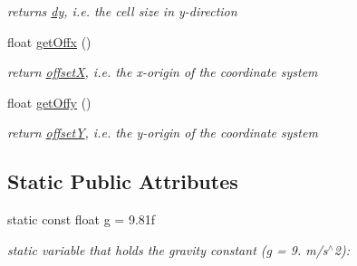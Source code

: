 \begin{DoxyCompactItemize}
\begin{DoxyCompactList}\small\item\em returns \hyperlink{classSWE__Block_a9feb988748d792bca0ca0508e43bd87f}{dy}, i.\-e. the cell size in y-\/direction \end{DoxyCompactList}\item 
\hypertarget{classSWE__Block_a5f279d69697c335d5e9c9c4d3c54e3b8}{float \hyperlink{classSWE__Block_a5f279d69697c335d5e9c9c4d3c54e3b8}{get\-Offx} ()}\label{classSWE__Block_a5f279d69697c335d5e9c9c4d3c54e3b8}

\begin{DoxyCompactList}\small\item\em return \hyperlink{classSWE__Block_aa9e9b1fa797c133c4989e4c54f09b542}{offset\-X}, i.\-e. the x-\/origin of the coordinate system \end{DoxyCompactList}\item 
\hypertarget{classSWE__Block_a22364064412b824204dc8a79bf572893}{float \hyperlink{classSWE__Block_a22364064412b824204dc8a79bf572893}{get\-Offy} ()}\label{classSWE__Block_a22364064412b824204dc8a79bf572893}

\begin{DoxyCompactList}\small\item\em return \hyperlink{classSWE__Block_aa05241101a66f0f0548eba6dbbaa1bbb}{offset\-Y}, i.\-e. the y-\/origin of the coordinate system \end{DoxyCompactList}\end{DoxyCompactItemize}
\subsection*{Static Public Attributes}
\begin{DoxyCompactItemize}
\item 
\hypertarget{classSWE__Block_a073ca743ff4077a7e456906be704958f}{static const float \hyperlink{classSWE__Block_a073ca743ff4077a7e456906be704958f}{g} = 9.\-81f}\label{classSWE__Block_a073ca743ff4077a7e456906be704958f}

\begin{DoxyCompactList}\small\item\em static variable that holds the gravity constant (g = 9. m/s$^\wedge$2)\-: \end{DoxyCompactList}\end{DoxyCompactItemize}
